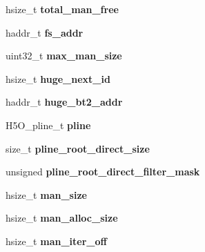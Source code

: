 \begin{DoxyCompactItemize}
hsize\+\_\+t {\bfseries total\+\_\+man\+\_\+free}
\item 
\mbox{\label{struct_h5_h_f__hdr__t_a6ef81ad95c7cac7999d1197d1473b968}} 
haddr\+\_\+t {\bfseries fs\+\_\+addr}
\item 
\mbox{\label{struct_h5_h_f__hdr__t_ae8741dd9d6458afb85837f34a1d249a7}} 
uint32\+\_\+t {\bfseries max\+\_\+man\+\_\+size}
\item 
\mbox{\label{struct_h5_h_f__hdr__t_a3851417d065f91e69731d55ae5e65978}} 
hsize\+\_\+t {\bfseries huge\+\_\+next\+\_\+id}
\item 
\mbox{\label{struct_h5_h_f__hdr__t_a07ff883c8f272551fa31e07ddefb5631}} 
haddr\+\_\+t {\bfseries huge\+\_\+bt2\+\_\+addr}
\item 
\mbox{\label{struct_h5_h_f__hdr__t_af93874b29a80137464994fccf1e948a9}} 
H5\+O\+\_\+pline\+\_\+t {\bfseries pline}
\item 
\mbox{\label{struct_h5_h_f__hdr__t_a16a4acd27ce05eda7f9f1427bb90e611}} 
size\+\_\+t {\bfseries pline\+\_\+root\+\_\+direct\+\_\+size}
\item 
\mbox{\label{struct_h5_h_f__hdr__t_a3dbc11bce47ba6cad6a8e4c57c3061aa}} 
unsigned {\bfseries pline\+\_\+root\+\_\+direct\+\_\+filter\+\_\+mask}
\item 
\mbox{\label{struct_h5_h_f__hdr__t_a194ae3c906dbd4ce670288ab8a68a9c3}} 
hsize\+\_\+t {\bfseries man\+\_\+size}
\item 
\mbox{\label{struct_h5_h_f__hdr__t_a6f22086ebee71bffaa889b7aac50d843}} 
hsize\+\_\+t {\bfseries man\+\_\+alloc\+\_\+size}
\item 
\mbox{\label{struct_h5_h_f__hdr__t_a7de4a6469386a6845408f855707f6d37}} 
hsize\+\_\+t {\bfseries man\+\_\+iter\+\_\+off}
\item 
\mbox{\label{struct_h5_h_f__hdr__t_aba072dcef4af93b0979231e6262d7650}} 

\end{DoxyCompactItemize}
